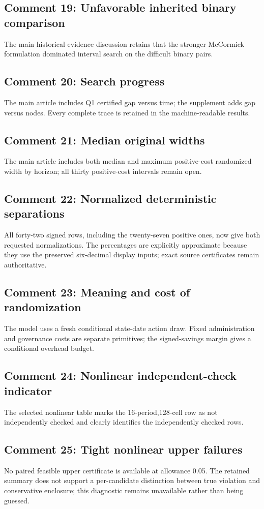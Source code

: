 \subsection{Comment 19: Unfavorable inherited binary comparison}
The main historical-evidence discussion retains that the stronger McCormick formulation dominated interval search on the difficult binary pairs.

\subsection{Comment 20: Search progress}
The main article includes Q1 certified gap versus time; the supplement adds gap versus nodes. Every complete trace is retained in the machine-readable results.

\subsection{Comment 21: Median original widths}
The main article includes both median and maximum positive-cost randomized width by horizon; all thirty positive-cost intervals remain open.

\subsection{Comment 22: Normalized deterministic separations}
All forty-two signed rows, including the twenty-seven positive ones, now give both requested normalizations. The percentages are explicitly approximate because they use the preserved six-decimal display inputs; exact source certificates remain authoritative.

\subsection{Comment 23: Meaning and cost of randomization}
The model uses a fresh conditional state-date action draw. Fixed administration and governance costs are separate primitives; the signed-savings margin gives a conditional overhead budget.

\subsection{Comment 24: Nonlinear independent-check indicator}
The selected nonlinear table marks the 16-period,128-cell row as not independently checked and clearly identifies the independently checked rows.

\subsection{Comment 25: Tight nonlinear upper failures}
No paired feasible upper certificate is available at allowance 0.05. The retained summary does not support a per-candidate distinction between true violation and conservative enclosure; this diagnostic remains unavailable rather than being guessed.

